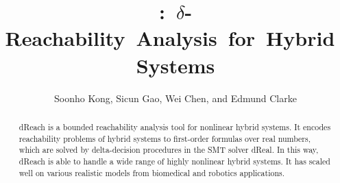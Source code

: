 \documentclass{llncs}
\title{\mbox{\dReach{}: $\delta$-Reachability Analysis for Hybrid Systems}}
\newcommand{\dReal}{\textsf{dReal}}
\newcommand{\dReach}{\textsf{dReach}}
\begin{document}
\mainmatter  %

\author{Soonho Kong, Sicun Gao, Wei Chen, and Edmund Clarke}
\maketitle

\begin{abstract}
  \dReach{} is a bounded reachability analysis tool for nonlinear
  hybrid systems. It encodes reachability problems of hybrid systems
  to first-order formulas over real numbers, which are solved by
  delta-decision procedures in the SMT solver \dReal{}. In this way,
  \dReach{} is able to handle a wide range of highly nonlinear hybrid
  systems. It has scaled well on various realistic models
  from biomedical and robotics applications.
\end{abstract}












%
\end{document}
